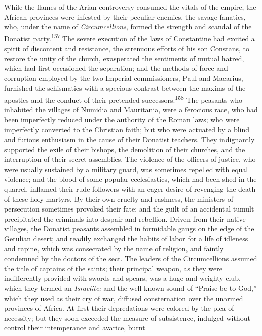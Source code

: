 While the flames of the Arian controversy consumed the vitals of
the empire, the African provinces were infested by their peculiar
enemies, the savage fanatics, who, under the name of
\textit{Circumcellions}, formed the strength and scandal of the Donatist
party.\textsuperscript{157} The severe execution of the laws of Constantine had
excited a spirit of discontent and resistance, the strenuous
efforts of his son Constans, to restore the unity of the church,
exasperated the sentiments of mutual hatred, which had first
occasioned the separation; and the methods of force and
corruption employed by the two Imperial commissioners, Paul and
Macarius, furnished the schismatics with a specious contrast
between the maxims of the apostles and the conduct of their
pretended successors.\textsuperscript{158} The peasants who inhabited the villages
of Numidia and Mauritania, were a ferocious race, who had been
imperfectly reduced under the authority of the Roman laws; who
were imperfectly converted to the Christian faith; but who were
actuated by a blind and furious enthusiasm in the cause of their
Donatist teachers. They indignantly supported the exile of their
bishops, the demolition of their churches, and the interruption
of their secret assemblies. The violence of the officers of
justice, who were usually sustained by a military guard, was
sometimes repelled with equal violence; and the blood of some
popular ecclesiastics, which had been shed in the quarrel,
inflamed their rude followers with an eager desire of revenging
the death of these holy martyrs. By their own cruelty and
rashness, the ministers of persecution sometimes provoked their
fate; and the guilt of an accidental tumult precipitated the
criminals into despair and rebellion. Driven from their native
villages, the Donatist peasants assembled in formidable gangs on
the edge of the Getulian desert; and readily exchanged the habits
of labor for a life of idleness and rapine, which was consecrated
by the name of religion, and faintly condemned by the doctors of
the sect. The leaders of the Circumcellions assumed the title of
captains of the saints; their principal weapon, as they were
indifferently provided with swords and spears, was a huge and
weighty club, which they termed an \textit{Israelite;} and the
well-known sound of “Praise be to God,” which they used as their
cry of war, diffused consternation over the unarmed provinces of
Africa. At first their depredations were colored by the plea of
necessity; but they soon exceeded the measure of subsistence,
indulged without control their intemperance and avarice, burnt
